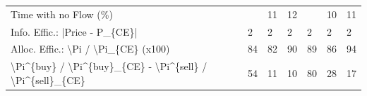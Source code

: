 \begin{tabular}{lllllll}
 Time with no Flow (\%)                                     &          & 11       & 12       &           & 10        & 11        \\
 Info. Effic.: |Price - P\_\{CE\}|                            & 2        & 2        & 2        & 2         & 2         & 2         \\
 Alloc. Effic.: \textbackslash{}Pi / \textbackslash{}Pi\_\{CE\} (x100)                      & 84       & 82       & 90       & 89        & 86        & 94        \\
 \textbackslash{}Pi\^{}\{buy\} / \textbackslash{}Pi\^{}\{buy\}\_\{CE\} - \textbackslash{}Pi\^{}\{sell\} / \textbackslash{}Pi\^{}\{sell\}\_\{CE\} & 54       & 11       & 10       & 80        & 28        & 17        \\
\hline
\end{tabular}